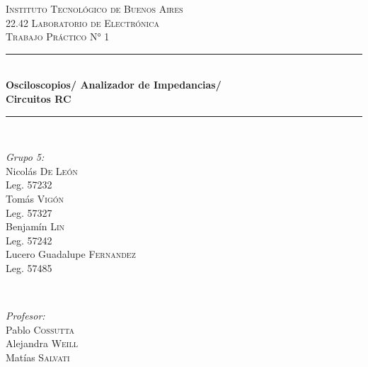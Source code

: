 \begin{titlepage}
    
\newcommand{\HRule}{\rule{\linewidth}{0.5mm}} %
    
\center %
     
    
\textsc{\LARGE Instituto Tecnológico de Buenos Aires}\\[2cm] %
\textsc{\Large 22.42 Laboratorio de Electrónica}\\[1.5cm] %
\textsc{\large Trabajo Práctico N° 1}\\[0.5cm] %
    
    
\HRule \\[0.5cm]
{ \huge \bfseries Osciloscopios/ Analizador de Impedancias/ \\Circuitos RC}\\[0.4cm] %
\HRule \\[2cm]
     
    
\begin{minipage}{0.4\textwidth}
\begin{flushleft} \large
\emph{Grupo 5:}\\		%
[.3cm]
Nicolás \textsc{De León}\\
Leg. 57232\\ 
[.3cm]
Tomás \textsc{Vigón}\\
Leg. 57327\\ 
[.3cm]
Benjamín \textsc{Lin}\\
Leg. 57242 \\ 
[.3cm]
Lucero Guadalupe \textsc{Fernandez}\\
Leg. 57485\\ 
[.3cm]
\end{flushleft}
\end{minipage}
~
\begin{minipage}{0.4\textwidth}
\begin{flushright} \large
\emph{Profesor:} \\
[.3cm]
Pablo  \textsc{Cossutta}\\ %
Alejandra \textsc{Weill} \\%
Matías  \textsc{Salvati} %
\end{flushright}
\end{minipage}\\[2cm]
    

\end{titlepage}
